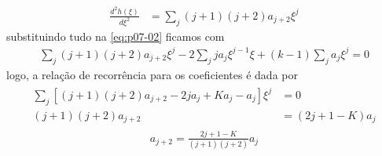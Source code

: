 \begin{prob}
\begin{sol}
\begin{enumerate}[label=\alph *)]
				\begin{align}
					\frac{d^{2}h(\xi)}{d \xi^{2}} &= \sum_{j}(j+1)(j+2)a_{j+2} \xi^{j}
				\end{align}
				substituindo tudo na \eqref{eq:p07-02} ficamos com
				\begin{align}
					\sum_{j}(j+1)(j+2)a_{j+2} \xi^{j}-2\sum_{j}ja_{j} \xi^{j-1} \xi+(k-1)\sum_{j}a_{j}\xi^{j}=0
				\end{align}
				logo, a relação de recorrência para os coeficientes é dada por
				\begin{align}
						\begin{split}
							\sum_{j}\left[(j+1)(j+2)a_{j+2}-2ja_{j}+Ka_{j}-a_{j}\right] \xi^{j} &= 0\\
							(j+1)(j+2)a_{j+2} &= \left(2j+1-K\right)a_{j} 
						\end{split}
				\end{align}
				\begin{align}
						\boxed{
							a_{j+2} = \frac{2j+1-K}{(j+1)(j+2)}a_{j}
						}
				\end{align}


		\end{enumerate}

	\end{sol}
\end{prob}
